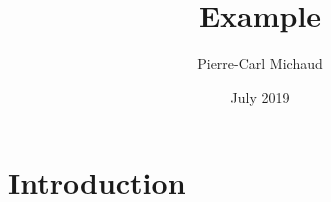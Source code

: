 \documentclass{article}
\title{Example}
\author{Pierre-Carl Michaud}
\date{July 2019}
\begin{document}
\maketitle

\section{Introduction}
\end{document}
